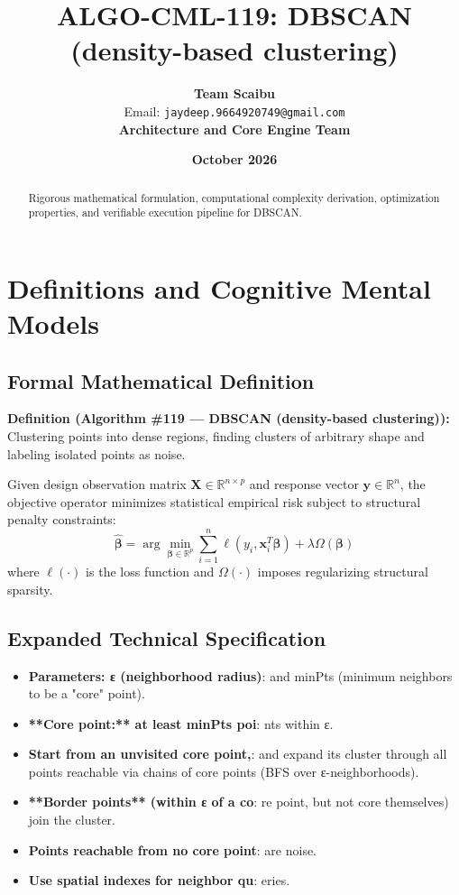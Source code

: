 \documentclass[11pt,a4paper]{article}
\title{\textbf{ALGO-CML-119: DBSCAN (density-based clustering)}}
\author{\textbf{Team Scaibu} \\ \small Email: \texttt{jaydeep.9664920749@gmail.com} \\ \small \textbf{Architecture and Core Engine Team}}
\date{\textbf{October 2026}}
\theoremstyle{definition}
\begin{document}
\maketitle

\begin{abstract}
Rigorous mathematical formulation, computational complexity derivation, optimization properties, and verifiable execution pipeline for DBSCAN.
\end{abstract}

\section{Definitions and Cognitive Mental Models}

\subsection{Formal Mathematical Definition}
\textbf{Definition (Algorithm \#119 --- DBSCAN (density-based clustering)):}
Clustering points into dense regions, finding clusters of arbitrary shape and labeling isolated points as noise.

Given design observation matrix $\mathbf{X} \in \mathbb{R}^{n \times p}$ and response vector $\mathbf{y} \in \mathbb{R}^n$, the objective operator minimizes statistical empirical risk subject to structural penalty constraints:
\begin{equation}
\hat{\boldsymbol{\beta}} = \arg\min_{\boldsymbol{\beta} \in \mathbb{R}^p} \sum_{i=1}^n \ell(y_i, \mathbf{x}_i^T \boldsymbol{\beta}) + \lambda \Omega(\boldsymbol{\beta})
\end{equation}
where $\ell(\cdot)$ is the loss function and $\Omega(\cdot)$ imposes regularizing structural sparsity.

\subsection{Expanded Technical Specification}
\begin{itemize}
\item \textbf{Parameters: ε (neighborhood radius)}:  and minPts (minimum neighbors to be a "core" point).
\item \textbf{**Core point:** at least minPts poi}: nts within ε.
\item \textbf{Start from an unvisited core point,}:  and expand its cluster through all points reachable via chains of core points (BFS over ε-neighborhoods).
\item \textbf{**Border points** (within ε of a co}: re point, but not core themselves) join the cluster.
\item \textbf{Points reachable from no core point}:  are noise.
\item \textbf{Use spatial indexes for neighbor qu}: eries.
\end{itemize}
\end{document}
